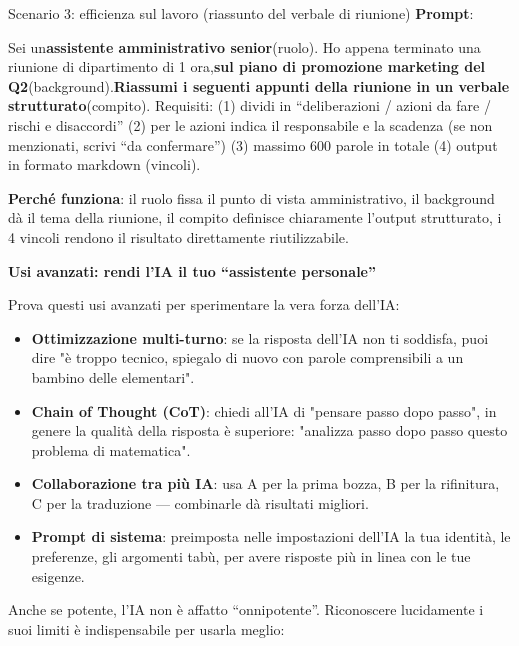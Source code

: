 \begin{tcbinfo}{Scenario 3: efficienza sul lavoro (riassunto del verbale di riunione)}
\textbf{Prompt}:

Sei un\textbf{assistente amministrativo senior}(ruolo). Ho appena terminato una riunione di dipartimento di 1 ora,\textbf{sul piano di promozione marketing del Q2}(background).\textbf{Riassumi i seguenti appunti della riunione in un verbale strutturato}(compito). Requisiti: (1) dividi in “deliberazioni / azioni da fare / rischi e disaccordi” (2) per le azioni indica il responsabile e la scadenza (se non menzionati, scrivi “da confermare”) (3) massimo 600 parole in totale (4) output in formato markdown (vincoli).

\textbf{Perché funziona}: il ruolo fissa il punto di vista amministrativo, il background dà il tema della riunione, il compito definisce chiaramente l'output strutturato, i 4 vincoli rendono il risultato direttamente riutilizzabile.

\end{tcbinfo}

\textbf{Usi avanzati: rendi l'IA il tuo “assistente personale”}\par

Prova questi usi avanzati per sperimentare la vera forza dell'IA:

\begin{itemize}
  \item \textbf{Ottimizzazione multi-turno}: se la risposta dell'IA non ti soddisfa, puoi dire "è troppo tecnico, spiegalo di nuovo con parole comprensibili a un bambino delle elementari".
  \item \textbf{Chain of Thought (CoT)}: chiedi all'IA di "pensare passo dopo passo", in genere la qualità della risposta è superiore: "analizza passo dopo passo questo problema di matematica".
  \item \textbf{Collaborazione tra più IA}: usa A per la prima bozza, B per la rifinitura, C per la traduzione — combinarle dà risultati migliori.
  \item \textbf{Prompt di sistema}: preimposta nelle impostazioni dell'IA la tua identità, le preferenze, gli argomenti tabù, per avere risposte più in linea con le tue esigenze.
\end{itemize}


Anche se potente, l'IA non è affatto “onnipotente”. Riconoscere lucidamente i suoi limiti è indispensabile per usarla meglio:

